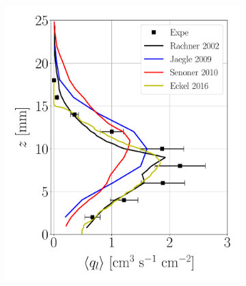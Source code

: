 

\begin{figure}[h!]
\flushleft
\begin{subfigure}[b]{0.9\textwidth}
	\centering
   \includegraphics[scale=0.22]{./part2_developments/figures_ch6_lagrangian_JICF/previous_numerical_results/flux_profiles_along_z}

\end{subfigure}
\end{figure}
